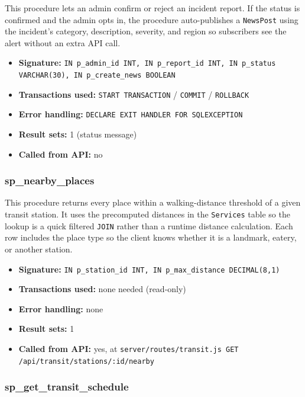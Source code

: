 This procedure lets an admin confirm or reject an incident report. If the status is confirmed and the admin opts in, the procedure auto-publishes a \texttt{NewsPost} using the incident's category, description, severity, and region so subscribers see the alert without an extra API call.

\begin{itemize}
    \item \textbf{Signature:} \texttt{IN p\_admin\_id INT, IN p\_report\_id INT, IN p\_status VARCHAR(30), IN p\_create\_news BOOLEAN}
    \item \textbf{Transactions used:} \texttt{START TRANSACTION} / \texttt{COMMIT} / \texttt{ROLLBACK}
    \item \textbf{Error handling:} \texttt{DECLARE EXIT HANDLER FOR SQLEXCEPTION}
    \item \textbf{Result sets:} 1 (status message)
    \item \textbf{Called from API:} no
\end{itemize}

\subsubsection{sp\_nearby\_places}

This procedure returns every place within a walking-distance threshold of a given transit station. It uses the precomputed distances in the \texttt{Services} table so the lookup is a quick filtered \texttt{JOIN} rather than a runtime distance calculation. Each row includes the place type so the client knows whether it is a landmark, eatery, or another station.

\begin{itemize}
    \item \textbf{Signature:} \texttt{IN p\_station\_id INT, IN p\_max\_distance DECIMAL(8,1)}
    \item \textbf{Transactions used:} none needed (read-only)
    \item \textbf{Error handling:} none
    \item \textbf{Result sets:} 1
    \item \textbf{Called from API:} yes, at \texttt{server/routes/transit.js GET /api/transit/stations/:id/nearby}
\end{itemize}

\subsubsection{sp\_get\_transit\_schedule}

